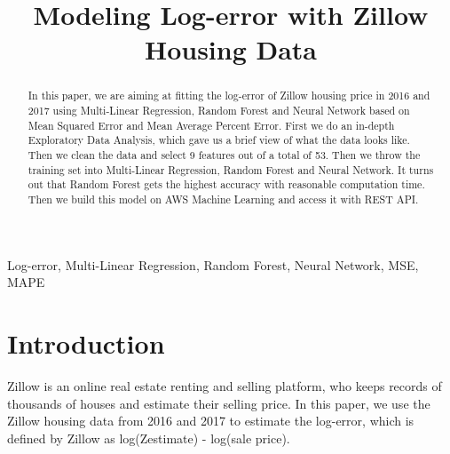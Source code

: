 \documentclass[conference]{IEEEtran}
\begin{document}
\title{Modeling Log-error with Zillow Housing Data}
%
\author{
}
\maketitle
\begin{abstract}
In this paper, we are aiming at fitting the log-error of Zillow housing price in 2016 and 2017 using Multi-Linear Regression, Random Forest and Neural Network based on Mean Squared Error and Mean Average Percent Error.  First we do an in-depth Exploratory Data Analysis, which gave us a brief view of what the data looks like. Then we clean the data and select 9 features out of a total of 53. Then we throw the training set into Multi-Linear Regression, Random Forest and Neural Network. It turns out that Random Forest gets the highest accuracy with reasonable computation time. Then we build this model on AWS Machine Learning and access it with REST API.
\end{abstract}
\begin{keywords}
Log-error, Multi-Linear Regression, Random Forest, Neural Network, MSE, MAPE
\end{keywords}
\IEEEpeerreviewmaketitle
%
\section{Introduction}\label{i}
\indent Zillow is an online real estate renting and selling platform, who keeps records of thousands of houses and estimate their selling price. In this paper, we use the Zillow housing data from 2016 and 2017 to estimate the log-error, which is defined by Zillow as log(Zestimate) - log(sale price). \\
%
\end{document}
